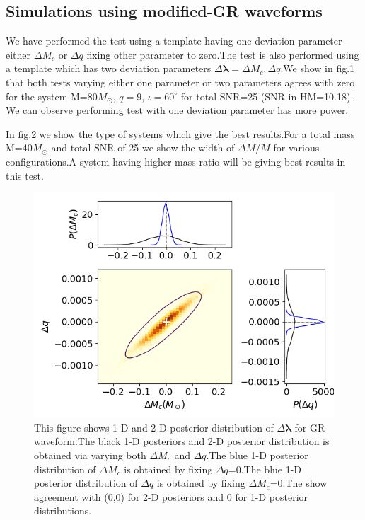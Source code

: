 \documentclass[prd,preprintnumbers,twocolumn,eqsecnum,floatfix,a4paper,nofootinbib,superscriptaddress]{revtex4}
\newcommand{\blambda}{\bm{\lambda}}
\begin{document}
\subsection{Simulations using modified-GR waveforms}
We have performed the test using a template having one deviation parameter either $\Delta M_c$ or $\Delta q$ fixing other parameter to zero.The test is also performed using a template which has two deviation parameters $\Delta \blambda={\Delta M_c, \Delta q}$.We show in fig.1 that both tests varying either one parameter or two parameters agrees with zero for the system M=80$M_{\odot}$, $q=9$, $ {\iota}=60^{\circ} $ for total SNR=25 (SNR in HM=10.18). We can observe performing test with one deviation parameter has more power.

In fig.2 we show the type of systems which give the best results.For a total mass M=40$M_{\odot}$ and total SNR of 25 we show the width of $\Delta M/M$ for various configurations.A system having higher mass ratio will be giving best results in this test.


\begin{figure}[h]
	\includegraphics*[scale=0.5]{./../../plots/triangle_plot_gr}
	\caption{This figure shows 1-D and 2-D posterior distribution of $\Delta \blambda$ for GR waveform.The black 1-D posteriors and 2-D posterior distribution is obtained via varying both $\Delta M_c$ and $\Delta q$.The blue 1-D posterior distribution of $\Delta M_c$  is obtained by fixing $\Delta q$=0.The blue 1-D posterior distribution of $\Delta q$  is obtained by fixing $\Delta M_c$=0.The show agreement with (0,0) for 2-D posteriors and 0 for 1-D posterior distributions.}
\end{figure}
\end{document}
